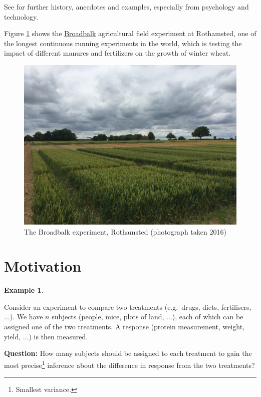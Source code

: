 \documentclass[
]{book}
\theoremstyle{definition}
\theoremstyle{definition}
\newtheorem{example}{Example}[chapter]
\theoremstyle{definition}
\theoremstyle{definition}
\theoremstyle{remark}
\begin{document}
See \citet{LB2020} for further history, anecdotes and examples, especially from psychology and technology.

Figure \ref{fig:broadbalk} shows the \href{http://www.era.rothamsted.ac.uk/Broadbalk}{Broadbalk} agricultural field experiment at Rothamsted, one of the longest continuous running experiments in the world, which is testing the impact of different manures and fertilizers on the growth of winter wheat.

\begin{figure}
 
 {\centering \includegraphics[width=0.75\linewidth]{figures/broadbalk} 
 
 }
 
 \caption{The Broadbalk experiment, Rothamsted (photograph taken 2016)}\label{fig:broadbalk}
 \end{figure}

\hypertarget{motivation}{%
\section{Motivation}\label{motivation}}

\begin{example}
\protect\hypertarget{exm:motivation}{}\label{exm:motivation}

Consider an experiment to compare two treatments (e.g.~drugs, diets, fertilisers, \(\dots\)). We have \(n\) subjects (people, mice, plots of land, \(\dots\)), each of which can be assigned one of the two treatments. A response (protein measurement, weight, yield, \(\dots\)) is then measured.

\end{example}

\textbf{Question:} How many subjects should be assigned to each treatment to gain the most precise\footnote{Smallest variance.} inference about the difference in response from the two treatments?
\end{document}
